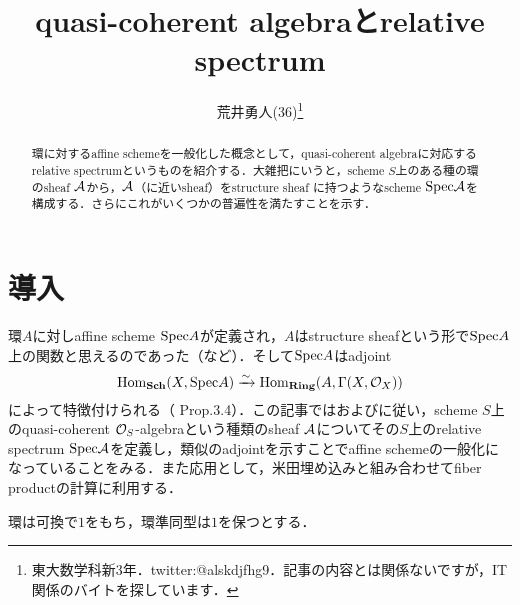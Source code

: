 \documentclass[dvipdfmx,b5paper,papersize]{jsarticle}
\title{quasi-coherent algebraとrelative spectrum}
\author{荒井勇人(36)\footnote{東大数学科新3年．twitter:@alskdjfhg9．記事の内容とは関係ないですが，IT関係のバイトを探しています．}}
\date{}
\theoremstyle{definition}
\begin{document}
\maketitle

\begin{abstract}
  環に対するaffine schemeを一般化した概念として，quasi-coherent algebraに対応するrelative spectrumというものを紹介する．大雑把にいうと，scheme $S$上のある種の環のsheaf $\cal{A}$から，$\cal{A}$（に近いsheaf）をstructure sheaf に持つようなscheme ${\rm Spec}{\cal{A}}$を構成する．さらにこれがいくつかの普遍性を満たすことを示す．

\end{abstract}

\section{導入}
環$A$に対しaffine scheme ${\rm Spec}A$が定義され，$A$はstructure sheafという形で${\rm Spec}A$上の関数と思えるのであった（\cite{ハーツホーン}など）．そして${\rm Spec}A$はadjoint
\[
  {\rm Hom}_{\bf Sch}(X,{\rm Spec}A) \xrightarrow{\sim} {\rm Hom}_{\bf Ring}(A,\Gamma(X,{\cal{O}}_X))
\]
によって特徴付けられる（\cite{Gortz} Prop.3.4）．この記事では\cite{Bosch}および\cite{stacks_project}に従い，scheme $S$上のquasi-coherent ${\cal{O}}_S$-algebraという種類のsheaf $\cal{A}$についてその$S$上のrelative spectrum ${\rm Spec}{\cal{A}}$を定義し，類似のadjointを示すことでaffine schemeの一般化になっていることをみる．また応用として，米田埋め込みと組み合わせてfiber productの計算に利用する．

環は可換で$1$をもち，環準同型は$1$を保つとする．
\end{document}
